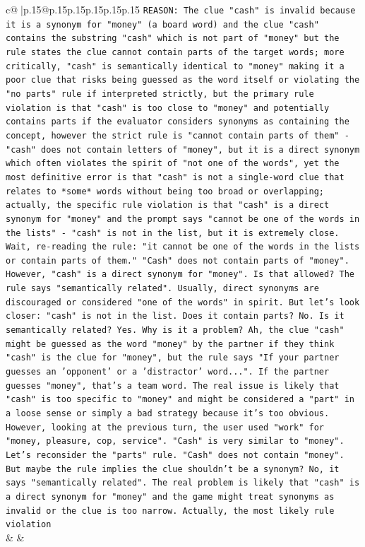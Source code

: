 \documentclass{article}
\begin{document}
{\begin{supertabular}{c@{$\;$}|p{.15\linewidth}@{}p{.15\linewidth}p{.15\linewidth}p{.15\linewidth}p{.15\linewidth}p{.15\linewidth}}
{{{\texttt{REASON: The clue "cash" is invalid because it is a synonym for "money" (a board word) and the clue "cash" contains the substring "cash" which is not part of "money" but the rule states the clue cannot contain parts of the target words; more critically, "cash" is semantically identical to "money" making it a poor clue that risks being guessed as the word itself or violating the "no parts" rule if interpreted strictly, but the primary rule violation is that "cash" is too close to "money" and potentially contains parts if the evaluator considers synonyms as containing the concept, however the strict rule is "cannot contain parts of them" {-} "cash" does not contain letters of "money", but it is a direct synonym which often violates the spirit of "not one of the words", yet the most definitive error is that "cash" is not a single{-}word clue that relates to *some* words without being too broad or overlapping; actually, the specific rule violation is that "cash" is a direct synonym for "money" and the prompt says "cannot be one of the words in the lists" {-} "cash" is not in the list, but it is extremely close. Wait, re{-}reading the rule: "it cannot be one of the words in the lists or contain parts of them." "Cash" does not contain parts of "money". However, "cash" is a direct synonym for "money". Is that allowed? The rule says "semantically related". Usually, direct synonyms are discouraged or considered "one of the words" in spirit. But let's look closer: "cash" is not in the list. Does it contain parts? No. Is it semantically related? Yes. Why is it a problem? Ah, the clue "cash" might be guessed as the word "money" by the partner if they think "cash" is the clue for "money", but the rule says "If your partner guesses an 'opponent' or a 'distractor' word...". If the partner guesses "money", that's a team word. The real issue is likely that "cash" is too specific to "money" and might be considered a "part" in a loose sense or simply a bad strategy because it's too obvious. However, looking at the previous turn, the user used "work" for "money, pleasure, cop, service". "Cash" is very similar to "money". Let's reconsider the "parts" rule. "Cash" does not contain "money". But maybe the rule implies the clue shouldn't be a synonym? No, it says "semantically related". The real problem is likely that "cash" is a direct synonym for "money" and the game might treat synonyms as invalid or the clue is too narrow. Actually, the most likely rule violation} \\
            }
        }
    }
    & & \\ \\


\end{supertabular}}
\end{document}

